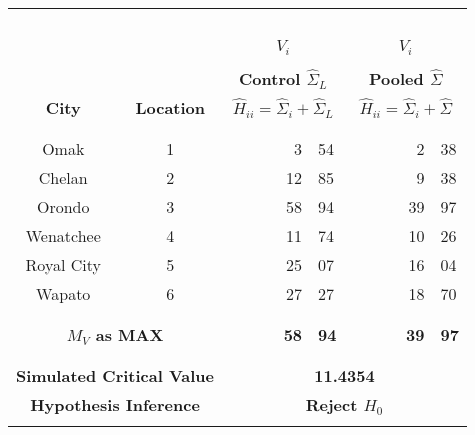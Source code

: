 		\begin{tabular*}{125mm}{ccr@{.}lr@{.}l}
		\hline	
		\hline		
		{\ } & {\ } & \multicolumn{2}{c}{{\ }}  & \multicolumn{2}{c}{{\ }} \\
		& & \multicolumn{2}{c}{$V_i$}  & \multicolumn{2}{c}{$V_i$} \\
		\multicolumn{6}{c}{ }\\
		&  & \multicolumn{2}{c}{\bf{Control $\hat{\Sigma}_L$}} & \multicolumn{2}{c}{\bf{Pooled $\hat{\Sigma}$} } \\
		{\bf{City}} & {\bf{Location}} &  \multicolumn{2}{c}{$\hat{H}_{ii} = \hat{\Sigma}_i + \hat{\Sigma}_L$}  & \multicolumn{2}{c}{$\hat{H}_{ii} = \hat{\Sigma}_i + \hat{\Sigma}$} \\
		\multicolumn{6}{c}{ }\\
		\hline
		\multicolumn{6}{c}{ }\\
		Omak & {1}		& {\ \ \ \ \ \ \ \ }3&54 		& {\ \ \ \ \ \ \ \ }2&38 \\
		Chelan & {2}		& 12&85		& 9&38 \\
		Orondo & {3}		& 58&94		& 39&97 \\
		Wenatchee & {4}		& 11&74		& 10&26 \\
		Royal City & {5}	& 25&07		& 16&04 \\
		Wapato & {6}		& 27&27		& 18&70  \\
		\multicolumn{6}{c}{ }\\
		\hline
		\multicolumn{6}{c}{ }\\
		\multicolumn{2}{c}{\bf{$M_V$ as MAX}} & \bf{58}&\bf{94} & \bf{39}&\bf{97} \\
		\multicolumn{6}{c}{ }\\
		\hline
		\multicolumn{6}{c}{ }\\
		\multicolumn{2}{c}{\bf{Simulated Critical Value}} & \multicolumn{4}{c}{\bf{11.4354}} \\
		\multicolumn{2}{c}{\bf{Hypothesis Inference}} & \multicolumn{4}{c}{\bf{Reject $H_0$}}\\
		\multicolumn{6}{c}{ }\\
		\hline
		\hline
		\end{tabular*}
			
